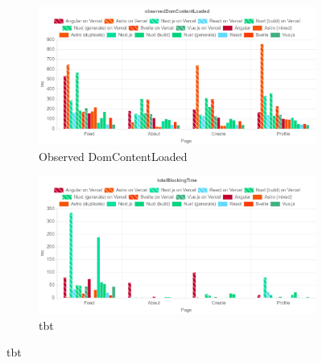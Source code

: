 \documentclass[a4paper, 12pt]{article}
\begin{document}
\begin{figure}[ht!]\ContinuedFloat
  \centering  
  \begin{subfigure}{0.8\linewidth}
    \begin{center}
      \includegraphics[width=\linewidth, keepaspectratio]{img/lighthouse-results/observedDomContentLoaded.png}
    \end{center}
    \caption{Observed DomContentLoaded}\label{subfig:LH:observedDomContentLoaded}
  \end{subfigure}
  \begin{subfigure}{0.8\linewidth}
    \begin{center}
      \includegraphics[width=\linewidth, keepaspectratio]{img/lighthouse-results/TBT.png}
    \end{center}
    \caption{\acrfull{tbt}}\label{subfig:LH:totalBlockingTime}
  \end{subfigure}
\end{figure}
\end{document}
